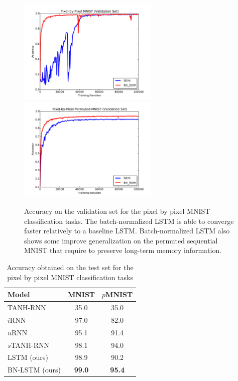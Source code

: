 \documentclass{article} %
\begin{document}
\begin{figure}[!t]
\center
\includegraphics[width=6.7cm]{figures/unpermuted_valid.pdf}
\includegraphics[width=6.7cm]{figures/permuted_valid.pdf}
\caption{Accuracy on the validation set for the pixel by pixel MNIST
classification tasks. The batch-normalized LSTM is able to converge faster
relatively to a baseline LSTM.  Batch-normalized  LSTM also shows some improve
generalization on the permuted sequential MNIST that require to preserve
long-term memory information.}
\label{fig:seqmnist_valid}
\end{figure}



\begin{table}[!hb]
\center
\begin{tabular}{@{}lcc@{}}
  \toprule
  \bf Model & \bf MNIST & \bf $p$MNIST \\
  \midrule
  TANH-RNN~\citep{le2015simple} & 35.0 & 35.0\\
  $i$RNN~\citep{le2015simple} & 97.0 & 82.0\\
  $u$RNN~\citep{urnn} & 95.1 & 91.4\\
  $s$TANH-RNN~\citep{zhang2016architectural} & 98.1 & 94.0\\
  \midrule
  LSTM (ours) & 98.9 & 90.2\\
  BN-LSTM (ours) & \textbf{99.0} & \textbf{95.4}\\
  \bottomrule
\end{tabular}
\caption{Accuracy obtained on the test set for the pixel by pixel MNIST classification tasks}
\label{tab:seqmnist_test}

\end{table}
\end{document}

